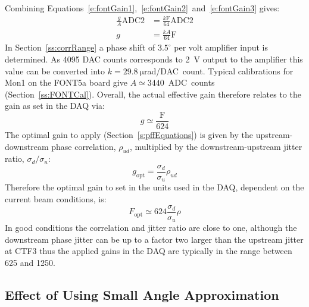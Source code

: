 Combining Equations~\ref{e:fontGain1},~\ref{e:fontGain2}~and~\ref{e:fontGain3} gives:
\begin{align}
\frac{g}{A}\mathrm{ADC2} &= \frac{k\mathrm{F}}{64}\mathrm{ADC2} \nonumber \\
g &= \frac{kA}{64}\mathrm{F} \label{e:fontGain4}
\end{align}
In Section~\ref{ss:corrRange} a phase shift of \(3.5^\circ\) per volt amplifier input is determined. As 4095 DAC counts corresponds to 2~V output to the amplifier this value can be converted into \(k = 29.8~\mathrm{\mu}\)rad/DAC~count. Typical calibrations for Mon1 on the FONT5a board give \(A \simeq 3440\)~ADC~counts (Section~\ref{ss:FONTCal}). Overall, the actual effective gain therefore relates to the gain as set in the DAQ via:
\begin{equation}
g \simeq \frac{\mathrm{F}}{624}
\end{equation}
The optimal gain to apply (Section~\ref{s:pffEquations}) is given by the upstream-downstream phase correlation, \(\rho_{ud}\), multiplied by the downstream-upstream jitter ratio, \(\sigma_{d}/\sigma_{u}\):
\begin{equation}
g_{\mathrm{opt}} = \frac{\sigma_{d}}{\sigma_{u}} \rho_{ud}  
\end{equation}
Therefore the optimal gain to set in the units used in the DAQ, dependent on the current beam conditions, is:
\begin{equation}
F_{\mathrm{opt}} \simeq 624 \frac{\sigma_{d}}{\sigma_{u}} \rho
\label{e:fontOptGain}
\end{equation}
In good conditions the correlation and jitter ratio are close to one, although the downstream phase jitter can be up to a factor two larger than the upstream jitter at CTF3 thus the applied gains in the DAQ are typically in the range between 625 and 1250.

\subsection{Effect of Using Small Angle Approximation}
\label{ss:fontSmallAng}

